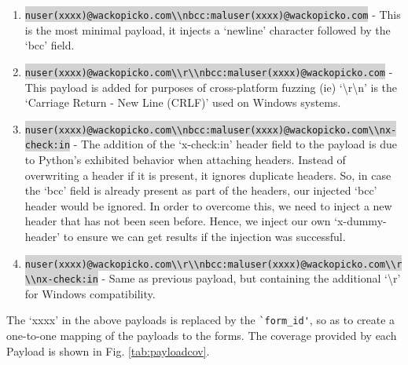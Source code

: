 \begin{enumerate}
	\item
	\colorbox{lightgray}{\lstinline{nuser(xxxx)@wackopicko.com\\nbcc:maluser(xxxx)@wackopicko.com}} - This is the most minimal payload, it injects a `newline' character followed by the `bcc' field.
	\item \colorbox{lightgray}{\lstinline{nuser(xxxx)@wackopicko.com\\r\\nbcc:maluser(xxxx)@wackopicko.com}} - This payload is added for purposes of cross-platform fuzzing (ie) `\textbackslash{}r\textbackslash{}n' is the `Carriage Return - New Line (CRLF)' used on Windows systems. 
	\item \colorbox{lightgray}{\lstinline{nuser(xxxx)@wackopicko.com\\nbcc:maluser(xxxx)@wackopicko.com\\nx-check:in}} - The addition of the `x-check:in' header field to the payload is due to Python's exhibited behavior when attaching
	headers. Instead of overwriting a header if it is present, it ignores duplicate headers. So, in case the `bcc' field is already present as part of the headers, our injected `bcc' header would be ignored. In order to overcome this, we need to inject a new header that has not been seen before. Hence, we inject our own `x-dummy-header' to ensure we can get results if the injection was successful.
	\item \colorbox{lightgray}{\lstinline{nuser(xxxx)@wackopicko.com\\r\\nbcc:maluser(xxxx)@wackopicko.com\\r\\nx-check:in}} - Same as previous payload, but containing the additional `\textbackslash{}r' for Windows compatibility.
	
\end{enumerate}
The `xxxx' in the above payloads is replaced by the \lstinline{`form_id'}, so as to create a one-to-one mapping of the payloads to the forms. The coverage provided by each Payload is shown in Fig. \ref{tab:payloadcov}.\\

